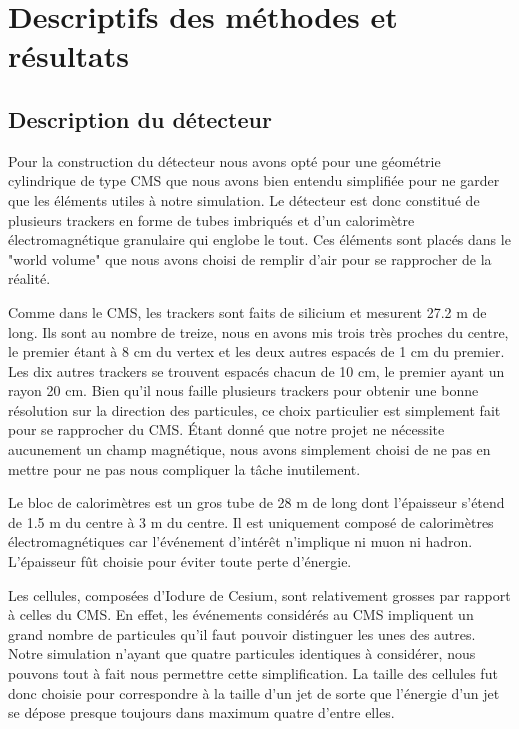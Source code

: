 \documentclass[11pt]{article}
\begin{document}
		    \section{Descriptifs des méthodes et résultats}

\subsection{Description du détecteur}

Pour la construction du détecteur nous avons opté pour une géométrie cylindrique
de type CMS que nous avons bien entendu simplifiée pour ne garder que les
éléments utiles à notre simulation. Le détecteur est donc constitué de plusieurs
trackers en forme de tubes imbriqués et d'un calorimètre
électromagnétique granulaire qui englobe le tout. Ces éléments sont placés dans
le "world volume" que nous avons choisi de remplir d'air pour se rapprocher de
la réalité.

Comme dans le CMS, les trackers sont faits de silicium et mesurent 27.2 m de
long. Ils sont au nombre de treize, nous en avons mis trois très proches du
centre, le premier étant à 8 cm du vertex et les deux autres espacés de 1 cm du
premier. Les dix autres trackers se trouvent espacés chacun de 10 cm, le premier
ayant un rayon 20 cm. Bien qu'il nous faille plusieurs trackers pour obtenir
une bonne résolution sur la direction des particules, ce choix particulier est
simplement
fait pour se rapprocher du CMS. Étant donné que notre projet ne nécessite
aucunement un champ magnétique, nous avons simplement choisi de ne pas en
mettre pour ne pas nous compliquer la tâche inutilement. 

Le bloc de calorimètres est un gros tube de 28 m de long dont
l'épaisseur s'étend de 1.5 m du centre à 3 m du centre. Il est uniquement
composé de calorimètres électromagnétiques car l'événement d'intérêt n'implique
ni muon ni hadron. L'épaisseur fût choisie pour éviter toute perte d'énergie.

Les cellules, composées d'Iodure de Cesium, sont relativement grosses par
rapport à celles du CMS. En effet, les événements considérés au CMS impliquent
un grand nombre de particules qu'il faut pouvoir distinguer les unes des
autres. Notre simulation n'ayant que quatre particules identiques à considérer,
nous pouvons tout à fait nous permettre cette simplification. La taille des
cellules fut donc choisie pour correspondre à la taille d'un jet de sorte que
l'énergie d'un jet se dépose presque toujours dans maximum quatre d'entre elles.
\end{document}
